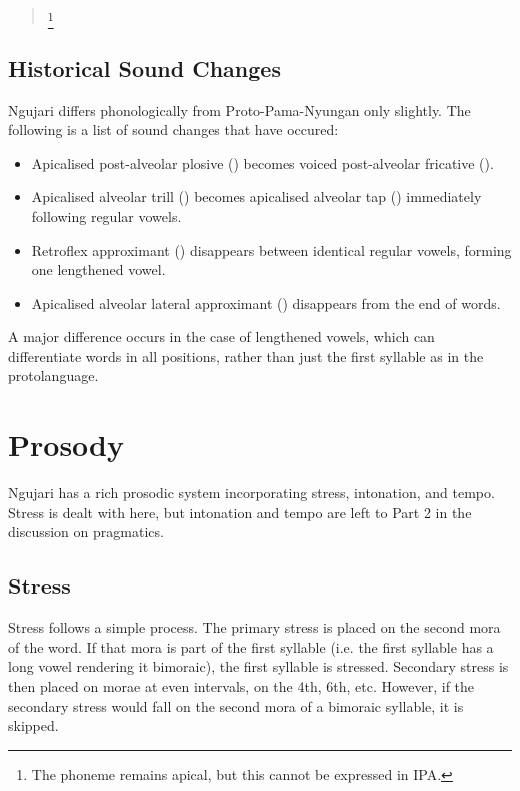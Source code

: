 \begin{quote}
\begin{multicols}{3}


\phonl{\textipa{\|]{t}}}{\textipa{\t*p}}{\^{}}\footnote{The phoneme remains
  apical, but this cannot be expressed in IPA.}
\end{multicols}
\end{quote}

\subsection{Historical Sound Changes}

Ngujari differs phonologically from Proto-Pama-Nyungan only slightly. The
following is a list of sound changes that have occured:

\begin{itemize}
\item Apicalised post-alveolar plosive () becomes
  voiced post-alveolar fricative ().
\item Apicalised alveolar trill (\textipa{\|]r}) becomes apicalised alveolar tap
  (\textipa{\|]R}) immediately following regular vowels.
\item Retroflex approximant (\textipa{\textturnrrtail}) disappears between
  identical regular vowels, forming one lengthened vowel.
\item Apicalised alveolar lateral approximant (\textipa{\|]l}) disappears from
  the end of words.
\end{itemize}

A major difference occurs in the case of lengthened vowels, which can
differentiate words in all positions, rather than just the first syllable as in
the protolanguage.

\section{Prosody}\label{prosody}

Ngujari has a rich prosodic system incorporating stress, intonation, and tempo.
Stress is dealt with here, but intonation and tempo are left to Part 2 in the
discussion on pragmatics.

\subsection{Stress}
Stress follows a simple process. The primary stress is placed on the second mora
of the word. If that mora is part of the first syllable (i.e. the first syllable
has a long vowel rendering it bimoraic), the first syllable is stressed.
Secondary stress is then placed on morae at even intervals, on the 4th, 6th,
etc. However, if the secondary stress would fall on the second mora of a
bimoraic syllable, it is skipped.
